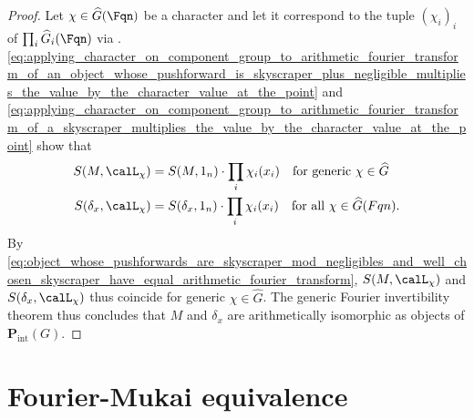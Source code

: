 \begin{proof}
    Let $\chi \in \widehat{G}(\Fqn)$ be a character and let it correspond to the tuple $(\chi_i)_i$ of $\prod_i \widehat{G}_i(\Fqn)$ via . \eqref{eq:applying_character_on_component_group_to_arithmetic_fourier_transform_of_an_object_whose_pushforward_is_skyscraper_plus_negligible_multiplies_the_value_by_the_character_value_at_the_point} and \eqref{eq:applying_character_on_component_group_to_arithmetic_fourier_transform_of_a_skyscraper_multiplies_the_value_by_the_character_value_at_the_point} show that  
    \begin{align*}
    S(M, \calL_\chi) &= S(M, 1_n) \cdot \prod_i \chi_i(x_i) \quad \text{for generic } \chi \in \widehat{G} \\
    S(\delta_x, \calL_\chi) &= S(\delta_x, 1_n) \cdot \prod_i \chi_i(x_i) \quad \text{for all } \chi \in \widehat{G}(Fqn).
    \end{align*}
    By \eqref{eq:object_whose_pushforwards_are_skyscraper_mod_negligibles_and_well_chosen_skyscraper_have_equal_arithmetic_fourier_transform}, $S(M, \calL_\chi)$ and $S(\delta_x, \calL_\chi)$ thus coincide for generic $
    \chi \in \widehat{G}$. The generic Fourier invertibility theorem \cite[Theorem 6.11]{forey_fresan_kowalski_aftff}  thus concludes that $M$ and $\delta_x$ are arithmetically isomorphic as objects of $\mathbf{P}_{\mathrm{int}}(G)$. 
\end{proof}



\section{Fourier-Mukai equivalence}



